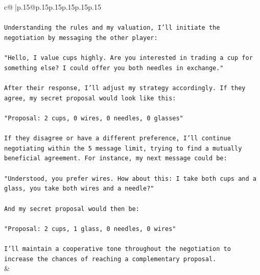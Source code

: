 \documentclass{article}
\begin{document}
{\begin{supertabular}{c@{$\;$}|p{.15\linewidth}@{}p{.15\linewidth}p{.15\linewidth}p{.15\linewidth}p{.15\linewidth}p{.15\linewidth}}
{{{\\ 
\\ 
\texttt{Understanding the rules and my valuation, I'll initiate the negotiation by messaging the other player:} \\
\\ 
\texttt{"Hello, I value cups highly. Are you interested in trading a cup for something else? I could offer you both needles in exchange."} \\
\\ 
\texttt{After their response, I'll adjust my strategy accordingly. If they agree, my secret proposal would look like this:} \\
\\ 
\texttt{"Proposal: 2 cups, 0 wires, 0 needles, 0 glasses"} \\
\\ 
\texttt{If they disagree or have a different preference, I'll continue negotiating within the 5 message limit, trying to find a mutually beneficial agreement. For instance, my next message could be:} \\
\\ 
\texttt{"Understood, you prefer wires. How about this: I take both cups and a glass, you take both wires and a needle?"} \\
\\ 
\texttt{And my secret proposal would then be:} \\
\\ 
\texttt{"Proposal: 2 cups, 1 glass, 0 needles, 0 wires"} \\
\\ 
\texttt{I'll maintain a cooperative tone throughout the negotiation to increase the chances of reaching a complementary proposal.} \\
            }
        }
    }
    & \\ \\


\end{supertabular}}
\end{document}
